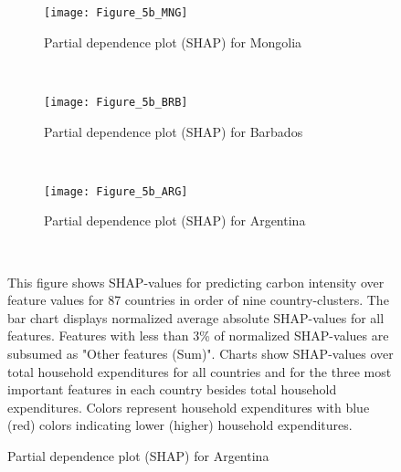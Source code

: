 \begin{figure}[ht!]\ContinuedFloat
    \centering
   \begin{subfigure}[b]{\textwidth}
         \centering
         \caption{Partial dependence plot (SHAP) for Mongolia}
         \label{fig:5b_MNG}
         \texttt{[image: Figure\_5b\_MNG]}         
     \end{subfigure}
    \\
    \vspace{0.5cm}
   \begin{subfigure}[b]{\textwidth}
         \centering
         \caption{Partial dependence plot (SHAP) for Barbados}
         \label{fig:5b_BRB}
         \texttt{[image: Figure\_5b\_BRB]}         
     \end{subfigure}
    \\
    \vspace{0.5cm}
   \begin{subfigure}[b]{\textwidth}
         \centering
         \caption{Partial dependence plot (SHAP) for Argentina}
         \label{fig:5b_ARG}
         \texttt{[image: Figure\_5b\_ARG]}
    \end{subfigure}
    \\
    \vspace{0.5cm}
    \begin{subcaption2}
     This figure shows SHAP-values for predicting carbon intensity over feature values for 87 countries in order of nine country-clusters. The bar chart displays normalized average absolute SHAP-values for all features. Features with less than 3\% of normalized SHAP-values are subsumed as "Other features (Sum)". Charts show SHAP-values over total household expenditures for all countries and for the three most important features in each country besides total household expenditures. Colors represent household expenditures with blue (red) colors indicating lower (higher) household expenditures.
     \end{subcaption2}
\end{figure}

